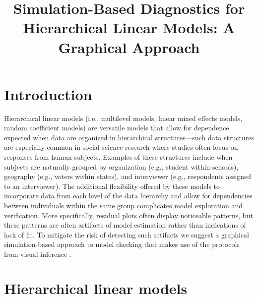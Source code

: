 \documentclass{article} %
\title{Simulation-Based Diagnostics for Hierarchical Linear Models: A Graphical Approach}
\begin{document}
\maketitle
{}
\section{Introduction}

Hierarchical linear models (i.e., multilevel models, linear mixed effects models, random coefficient models) are versatile models that allow for dependence expected when data are organized in hierarchical structures---such data structures are especially common in social science research where studies often focus on responses from human subjects. Examples of these structures include when subjects are naturally grouped by organization (e.g., student within schools), geography (e.g., voters within states), and interviewer (e.g., respondents assigned to an interviewer). The additional flexibility offered by these models to incorporate data from each level of the data hierarchy and allow for dependencies between individuals within the same group complicates model exploration and verification. More specifically, residual plots often display noticeable patterns, but these patterns are often artifacts of model estimation rather than indications of lack of fit. To mitigate the risk of detecting such artifacts we suggest a graphical simulation-based approach to model checking that makes use of the protocols from visual inference \citep{Buja:2009hp}.


\section{Hierarchical linear models}\label{sec:hlms}
\end{document}
